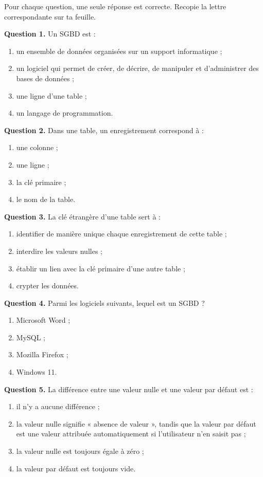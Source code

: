 \documentclass[11pt]{article}
\begin{document}
\begin{exercice}
Pour chaque question, une seule réponse est correcte. Recopie la lettre correspondante sur ta feuille.

\textbf{Question 1.} Un SGBD est :
\begin{enumerate}[label=\alph*)]
\item un ensemble de données organisées sur un support informatique ;
\item un logiciel qui permet de créer, de décrire, de manipuler et d'administrer des bases de données ;
\item une ligne d'une table ;
\item un langage de programmation.
\end{enumerate}

\textbf{Question 2.} Dans une table, un enregistrement correspond à :
\begin{enumerate}[label=\alph*)]
\item une colonne ; \item une ligne ; \item la clé primaire ; \item le nom de la table.
\end{enumerate}

\textbf{Question 3.} La clé étrangère d'une table sert à :
\begin{enumerate}[label=\alph*)]
\item identifier de manière unique chaque enregistrement de cette table ;
\item interdire les valeurs nulles ;
\item établir un lien avec la clé primaire d'une autre table ;
\item crypter les données.
\end{enumerate}

\textbf{Question 4.} Parmi les logiciels suivants, lequel est un SGBD ?
\begin{enumerate}[label=\alph*)]
\item Microsoft Word ; \item MySQL ; \item Mozilla Firefox ; \item Windows 11.
\end{enumerate}

\textbf{Question 5.} La différence entre une valeur nulle et une valeur par défaut est :
\begin{enumerate}[label=\alph*)]
\item il n'y a aucune différence ;
\item la valeur nulle signifie « absence de valeur », tandis que la valeur par défaut est une valeur attribuée automatiquement si l'utilisateur n'en saisit pas ;
\item la valeur nulle est toujours égale à zéro ;
\item la valeur par défaut est toujours vide.
\end{enumerate}
\end{exercice}
\end{document}
